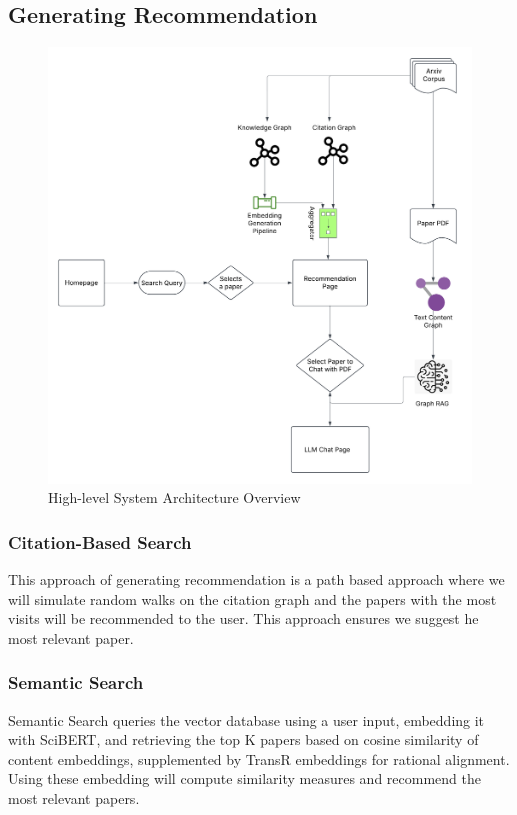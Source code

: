 \documentclass[a4paper,12pt]{article}
\begin{document}
\subsection{Generating Recommendation}
\begin{figure}[H]
    \centering
    \includegraphics[width=15cm]{architecture.png}
    \caption{High-level System Architecture Overview}
\end{figure}

\subsubsection{Citation-Based Search}
This approach of generating recommendation is a path based approach where we will
simulate random walks on the citation graph and the papers with the most visits will
be recommended to the user. This approach ensures we suggest he most relevant paper.

\subsubsection{Semantic Search}
Semantic Search queries the vector database using a user input, embedding it with
SciBERT, and retrieving the top K papers based on cosine similarity of content
embeddings, supplemented by TransR embeddings for rational alignment. Using these
embedding will compute similarity measures and recommend the most relevant papers.
\end{document}
